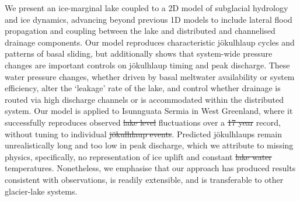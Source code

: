 \documentclass[tc, manuscript]{copernicus}
\providecommand{\DIFadd}[1]{{\protect\color{blue}\uwave{#1}}} %
\providecommand{\DIFdel}[1]{{\protect\color{red}\sout{#1}}} %
\providecommand{\DIFaddbegin}{} %
\providecommand{\DIFaddend}{} %
\providecommand{\DIFdelbegin}{} %
\providecommand{\DIFdelend}{} %
\begin{document}
We present an ice-marginal lake coupled to a 2D model of subglacial hydrology and ice dynamics, advancing beyond previous 1D models to include lateral flood propagation and coupling between the lake and distributed and channelised drainage components. Our model reproduces characteristic jökulhlaup cycles and patterns of basal sliding, but additionally shows that system-wide pressure changes are important controls on jökulhlaup timing and peak discharge. These water pressure changes, whether driven by basal meltwater availability or system efficiency, alter the `leakage' rate of the lake, and control whether drainage is routed via high discharge channels or is accommodated within the distributed system. Our model is applied to Isunnguata Sermia in West Greenland, where it successfully reproduces observed \DIFdelbegin \DIFdel{lake level }\DIFdelend \DIFaddbegin \DIFadd{lake-level }\DIFaddend fluctuations over a \DIFdelbegin \DIFdel{17 year }\DIFdelend \DIFaddbegin \DIFadd{17-year }\DIFaddend record, without tuning to individual \DIFdelbegin \DIFdel{jökulhlaup events}\DIFdelend \DIFaddbegin \DIFadd{jökulhlaups}\DIFaddend . Predicted jökulhlaups remain unrealistically long and too low in peak discharge, which we attribute to missing physics, specifically, no representation of ice uplift and constant \DIFdelbegin \DIFdel{lake water }\DIFdelend \DIFaddbegin \DIFadd{lake-water }\DIFaddend temperatures. Nonetheless, we emphasise that our approach has produced results consistent with observations, is readily extensible, and is transferable to other glacier-lake systems.

\DIFdelbegin %
\end{document}
